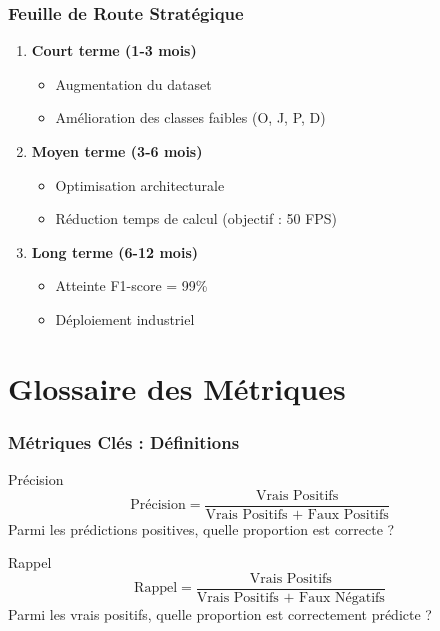 \documentclass[
	11pt,
	aspectratio=169,
]{beamer}
\begin{document}
\begin{frame}
	\frametitle{Feuille de Route Stratégique}
	
	\begin{enumerate}
		\item \textbf{Court terme (1-3 mois)}
		\begin{itemize}
			\item Augmentation du dataset
			\item Amélioration des classes faibles (O, J, P, D)
		\end{itemize}
		
		\bigskip
		
		\item \textbf{Moyen terme (3-6 mois)}
		\begin{itemize}
			\item Optimisation architecturale
			\item Réduction temps de calcul (objectif : 50 FPS)
		\end{itemize}
		
		\bigskip
		
		\item \textbf{Long terme (6-12 mois)}
		\begin{itemize}
			\item Atteinte F1-score = 99\%
			\item Déploiement industriel
		\end{itemize}
	\end{enumerate}
\end{frame}


\section{Glossaire des Métriques}

\begin{frame}
	\frametitle{Métriques Clés : Définitions}
	
	\begin{block}{Précision}
		\begin{equation*}
			\text{Précision} = \frac{\text{Vrais Positifs}}{\text{Vrais Positifs + Faux Positifs}}
		\end{equation*}
		Parmi les prédictions positives, quelle proportion est correcte ?
	\end{block}
	
	\begin{block}{Rappel}
		\begin{equation*}
			\text{Rappel} = \frac{\text{Vrais Positifs}}{\text{Vrais Positifs + Faux Négatifs}}
		\end{equation*}
		Parmi les vrais positifs, quelle proportion est correctement prédicte ?
	\end{block}
\end{frame}
\end{document}
